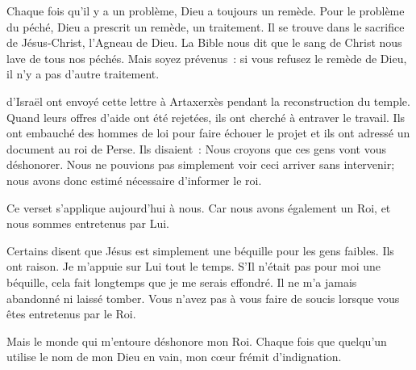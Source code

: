Chaque fois qu'il y a un problème, Dieu a toujours un remède.
 Pour le problème du péché, Dieu a prescrit un remède, un traitement.
 Il se trouve dans le sacrifice de Jésus-Christ, l'Agneau de Dieu.
 La Bible nous dit que le sang de Christ nous lave de tous nos péchés.
 Mais soyez prévenus~: si vous refusez le remède de Dieu,
 il n'y a pas d'autre traitement. 

\dvrule








 d'Israël ont envoyé cette lettre à Artaxerxès
 pendant la reconstruction du temple.
 Quand leurs offres d'aide ont été rejetées,
 ils ont cherché à entraver le travail.
 Ils ont embauché des hommes de loi pour faire échouer le projet
 et ils ont adressé un document au roi de Perse.
 Ils disaient~: \og Nous croyons que ces gens vont vous déshonorer.
 Nous ne pouvions pas simplement voir ceci arriver sans intervenir;
 nous avons donc estimé nécessaire d'informer le roi. \fg{}

Ce verset s'applique aujourd'hui à nous. Car nous avons également un Roi,
 et nous sommes entretenus par Lui.

Certains disent que Jésus est simplement une béquille pour les gens faibles.
 Ils ont raison. Je m'appuie sur Lui tout le temps.
 S'Il n'était pas pour moi une béquille,
 cela fait longtemps que je me serais effondré.
 Il ne m'a jamais abandonné ni laissé tomber.
 Vous n'avez pas à vous faire de soucis lorsque vous êtes entretenus par le Roi.

Mais le monde qui m'entoure déshonore mon Roi.
 Chaque fois que quelqu'un utilise le nom de mon Dieu en vain,
 mon cœur frémit d'indignation. 


